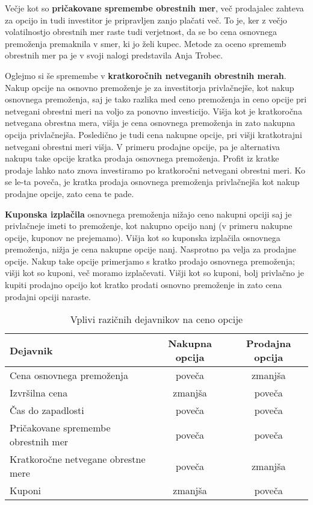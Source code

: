 \documentclass[a4paper]{article}
\begin{document}
Večje kot so \textbf{pričakovane spremembe obrestnih mer}, več prodajalec zahteva za opcijo in tudi investitor je pripravljen
zanjo plačati več. To je, ker z večjo volatilnostjo obrestnih mer raste tudi verjetnost, da se bo cena osnovnega premoženja premaknila
v smer, ki jo želi kupec. Metode za oceno sprememb obrestnih mer pa je v svoji nalogi predstavila Anja Trobec.

Oglejmo si še spremembe v \textbf{kratkoročnih netveganih obrestnih merah}. Nakup opcije na osnovno premoženje 
je za investitorja privlačnejše, kot nakup osnovnega premoženja, saj je tako razlika med ceno 
premoženja in ceno opcije pri netvegani obrestni meri na voljo za ponovno investicijo. Višja kot je kratkoročna netvegana 
obrestna mera, višja je cena osnovnega premoženja in zato nakupna opcija privlačnejša. Posledično je tudi cena nakupne opcije, pri 
višji kratkotrajni netvegani obrestni meri višja. V primeru prodajne opcije, pa je alternativa nakupu take opcije kratka prodaja
osnovnega premoženja. Profit iz kratke prodaje lahko nato znova investiramo po kratkoročni netvegani obrestni meri. Ko se le-ta poveča,
je kratka prodaja osnovnega premoženja privlačnejša kot nakup prodajne opcije, zato cena te pade.

\textbf{Kuponska izplačila} osnovnega premoženja nižajo ceno nakupni opciji saj je privlačneje imeti to premoženje, kot nakupno 
opcijo nanj (v primeru nakupne opcije, kuponov ne prejemamo). Višja kot so kuponska izplačila osnovnega premoženja, nižja je cena
nakupne opcije nanj. Nasprotno pa velja za prodajne opcije. Nakup take opcije primerjamo s kratko prodajo osnovnega premoženja;
višji kot so kuponi, več moramo izplačevati. Višji kot so kuponi, bolj privlačno je kupiti prodajno opcijo kot kratko prodati osnovno
premoženje in zato cena prodajni opciji naraste. 


\begin{table}
    \begin{tabular}{l|c|c}
        Dejavnik & Nakupna opcija & Prodajna opcija \\
        \hline\hline
        Cena osnovnega premoženja & poveča & zmanjša \\
        Izvršilna cena & zmanjša & poveča \\
        Čas do zapadlosti & poveča & poveča \\
        Pričakovane spremembe obrestnih mer & poveča & poveča \\
        Kratkoročne netvegane obrestne mere & poveča & zmanjša \\
        Kuponi & zmanjša & poveča
    \end{tabular}
    \caption{Vplivi razičnih dejavnikov na ceno opcije}
\end{table}

\nocite{*}



\end{document}

